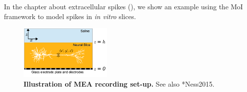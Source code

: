 In the chapter about extracellular spikes (), we show an example using the MoI framework
to model spikes in {\it in vitro} slices. 

\begin{figure}[!ht]
\begin{center}
\includegraphics[width=0.4\textwidth]{Figures/Sigma/MEA_illustration.pdf}
\end{center}
\caption[]{\textbf{Illustration of MEA recording set-up.}
See also \citeasnoun**{Ness2015}.
}
\label{fig:Sigma:MEA_illustration}
\end{figure}


